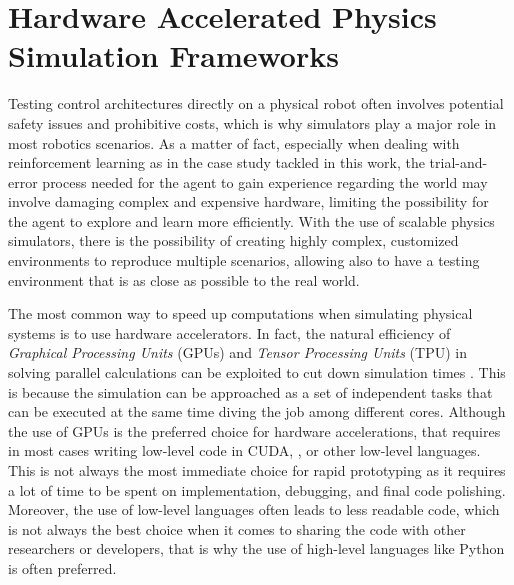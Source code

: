 \chapter{Hardware Accelerated Physics Simulation Frameworks}
\label{chp:back_PhysicsSimulators}


Testing control architectures directly on a physical robot often involves potential safety issues and prohibitive costs, which is why simulators play a major role in most robotics scenarios. As a matter of fact, especially when dealing with reinforcement learning as in the case study tackled in this work, the trial-and-error process needed for the agent to gain experience regarding the world may involve damaging complex and expensive hardware, limiting the possibility for the agent to explore and learn more efficiently. With the use of scalable physics simulators, there is the possibility of creating highly complex, customized environments to reproduce multiple scenarios, allowing also to have a testing environment that is as close as possible to the real world.

The most common way to speed up computations when simulating physical systems is to use hardware accelerators. In fact, the natural efficiency of \textit{Graphical Processing Units} (\ac{GPU}s) and \textit{Tensor Processing Units} (\ac{TPU}) in solving parallel calculations can be exploited to cut down simulation times \citep{liang_gpu-accelerated_2018}. This is because the simulation can be approached as a set of independent tasks that can be executed at the same time diving the job among different cores. Although the use of \ac{GPU}s is the preferred choice for hardware accelerations, that requires in most cases writing low-level code in \ac{CUDA}, \cpp, or other low-level languages. This is not always the most immediate choice for rapid prototyping as it requires a lot of time to be spent on implementation, debugging, and final code polishing. Moreover, the use of low-level languages often leads to less readable code, which is not always the best choice when it comes to sharing the code with other researchers or developers, that is why the use of high-level languages like Python is often preferred.

